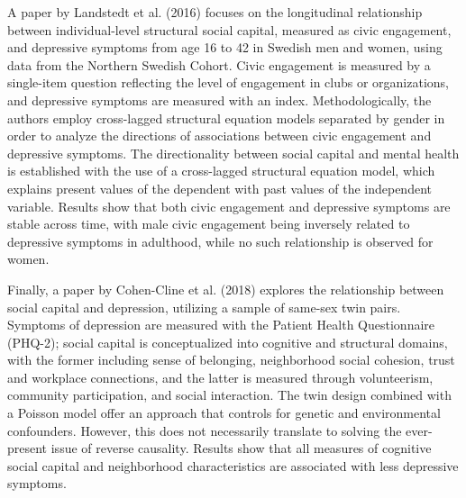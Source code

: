     A paper by Landstedt et al. (2016) focuses on the longitudinal relationship between individual-level structural social capital, measured as civic engagement, and depressive symptoms from age 16 to 42 in Swedish men and women, using data from the Northern Swedish Cohort. Civic engagement is measured by a single-item question reflecting the level of engagement in clubs or organizations, and depressive symptoms are measured with an index.
    Methodologically, the authors employ cross-lagged structural equation models separated by gender in order to analyze the directions of associations between civic engagement and depressive symptoms. The directionality between social capital and mental health is established with the use of a cross-lagged structural equation model, which explains present values of the dependent with past values of the independent variable. Results show that both civic engagement and depressive symptoms are stable across time, with male civic engagement being inversely related to depressive symptoms in adulthood, while no such relationship is observed for women. 

    Finally, a paper by Cohen-Cline et al. (2018) explores the relationship between social capital and depression, utilizing a sample of same-sex twin pairs. Symptoms of depression are measured with the Patient Health Questionnaire (PHQ-2); social capital is conceptualized into cognitive and structural domains, with the former including sense of belonging, neighborhood social cohesion, trust and workplace connections, and the latter is measured through volunteerism, community participation, and social interaction.
    The twin design combined with a Poisson model offer an approach that controls for genetic and environmental confounders. However, this does not necessarily translate to solving the ever-present issue of reverse causality. 
    Results show that all measures of cognitive social capital and neighborhood characteristics are associated with less depressive symptoms. 
    

